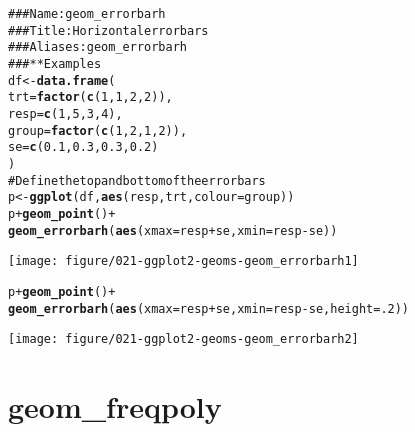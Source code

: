 \documentclass[a4paper,titlepage]{tufte-handout}\usepackage{graphicx, color}
\makeatletter
\def\maxwidth{ %
  \ifdim\Gin@nat@width>\linewidth
    \linewidth
  \else
    \Gin@nat@width
  \fi
}
\newcommand{\hlfunctioncall}[1]{\textcolor[rgb]{0.501960784313725,0,0.329411764705882}{\textbf{#1}}}%
\newcommand{\hlcomment}[1]{\textcolor[rgb]{0.180392156862745,0.6,0.341176470588235}{#1}}%
\newenvironment{kframe}{%
 \def\at@end@of@kframe{}%
 \ifinner\ifhmode%
  \def\at@end@of@kframe{\end{minipage}}%
  \begin{minipage}{\columnwidth}%
 \fi\fi%
 \def\FrameCommand##1{\hskip\@totalleftmargin \hskip-\fboxsep
 \colorbox{shadecolor}{##1}\hskip-\fboxsep
     \hskip-\linewidth \hskip-\@totalleftmargin \hskip\columnwidth}%
 \MakeFramed {\advance\hsize-\width
   \@totalleftmargin\z@ \linewidth\hsize
   \@setminipage}}%
 {\par\unskip\endMakeFramed%
 \at@end@of@kframe}
\newenvironment{knitrout}{}{} %
\makeatother
\begin{document}
\begin{knitrout}
\color{fgcolor}\begin{kframe}
\begin{alltt}
\hlcomment{### Name: geom_errorbarh}
\hlcomment{### Title: Horizontal error bars}
\hlcomment{### Aliases: geom_errorbarh}
\hlcomment{### ** Examples}
df <- \hlfunctioncall{data.frame}(
  trt = \hlfunctioncall{factor}(\hlfunctioncall{c}(1, 1, 2, 2)),
  resp = \hlfunctioncall{c}(1, 5, 3, 4),
  group = \hlfunctioncall{factor}(\hlfunctioncall{c}(1, 2, 1, 2)),
  se = \hlfunctioncall{c}(0.1, 0.3, 0.3, 0.2)
)
\hlcomment{# Define the top and bottom of the errorbars}
p <- \hlfunctioncall{ggplot}(df, \hlfunctioncall{aes}(resp, trt, colour = group))
p + \hlfunctioncall{geom_point}() +
  \hlfunctioncall{geom_errorbarh}(\hlfunctioncall{aes}(xmax = resp + se, xmin = resp - se))
\end{alltt}
\end{kframe}\texttt{[image: figure/021-ggplot2-geoms-geom\_errorbarh1]} \begin{kframe}\begin{alltt}
p + \hlfunctioncall{geom_point}() +
  \hlfunctioncall{geom_errorbarh}(\hlfunctioncall{aes}(xmax = resp + se, xmin = resp - se, height = .2))
\end{alltt}
\end{kframe}\texttt{[image: figure/021-ggplot2-geoms-geom\_errorbarh2]} 
\end{knitrout}


\section{geom\_freqpoly}
\end{document}
